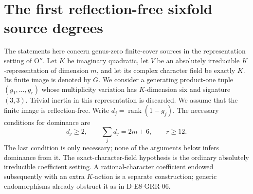 \section{The first reflection-free sixfold source degrees}
\label{sec:bireflection-gate}

The statements here concern genus-zero finite-cover sources in the
representation setting of O$''$.  Let $K$ be imaginary quadratic,
let $V$ be an absolutely irreducible $K$-representation of dimension
$m$, and let its complex character field be exactly $K$.  Its finite
image is denoted by $G$.  We consider a generating product-one tuple
$(g_1,\ldots,g_r)$ whose multiplicity variation has $K$-dimension six
and signature $(3,3)$.  Trivial inertia in this representation is
discarded.  We assume that the finite image is reflection-free.
Write $d_j=\operatorname{rank}(1-g_j)$.  The necessary conditions for
dominance are
\[
 d_j\ge2,\qquad \sum_jd_j=2m+6,\qquad r\ge12.
\tag{BI.1}
\]
The last condition is only necessary; none of the arguments below
infers dominance from it.  The exact-character-field hypothesis is
the ordinary absolutely irreducible coefficient setting.  A
rational-character coefficient endowed subsequently with an extra
$K$-action is a separate construction; generic endomorphisms already
obstruct it as in D-E8-GRR-06.

